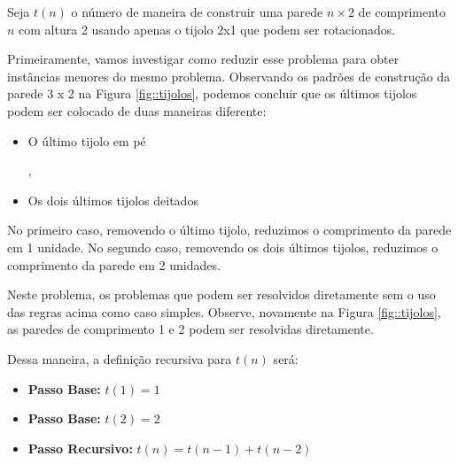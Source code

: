 Seja $t(n)$ o número de maneira de construir uma parede $n \times  2$ de comprimento $n$ com altura 2 usando apenas o tijolo 2x1 que podem ser rotacionados.

Primeiramente, vamos investigar como reduzir esse problema para obter instâncias menores do mesmo problema. Observando os padrões de construção da parede 3 x 2 na Figura \ref{fig::tijolos}, podemos concluir que os últimos tijolos podem ser colocado de duas maneiras diferente:


\begin{itemize}

\item O último tijolo em pé
    
,

\item Os dois últimos tijolos deitados


\end{itemize}

No primeiro caso, removendo o último tijolo, reduzimos o comprimento da parede em 1 unidade. No segundo caso, removendo os dois últimos tijolos, reduzimos o comprimento da parede em 2 unidades.


Neste problema, os problemas que podem ser resolvidos diretamente sem o uso das regras acima como caso simples. Observe, novamente na Figura \ref{fig::tijolos}, as paredes de comprimento 1 e 2 podem ser resolvidas diretamente. 


Dessa maneira, a definição recursiva para $t(n)$ será:

\begin{itemize}
    \item \textbf{Passo Base:} $t(1) = 1$
    \item \textbf{Passo Base:} $t(2) = 2$
    
    \item \textbf{Passo Recursivo:} $t(n) = t(n-1) + t(n-2)$
\end{itemize}

